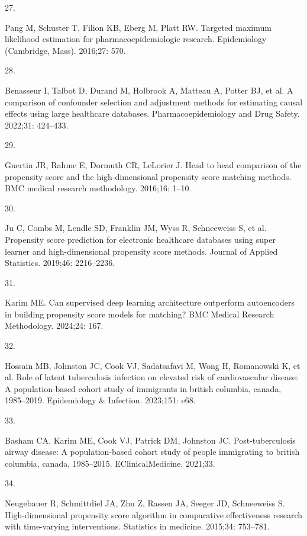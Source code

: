 \documentclass[10pt,letterpaper]{article}
\newlength{\cslhangindent}
\newlength{\csllabelwidth}
\newenvironment{CSLReferences}[2] %
 {\begin{list}{}{%
  \setlength{\itemindent}{0pt}
  \setlength{\leftmargin}{0pt}
  \setlength{\parsep}{0pt}
  \ifodd #1
   \setlength{\leftmargin}{\cslhangindent}
   \setlength{\itemindent}{-1\cslhangindent}
  \fi
  \setlength{\itemsep}{#2\baselineskip}}}
 {\end{list}}
\newcommand{\CSLLeftMargin}[1]{\parbox[t]{\csllabelwidth}{#1}}
\newcommand{\CSLRightInline}[1]{\parbox[t]{\linewidth - \csllabelwidth}{#1}\break}
\begin{document}
\begin{CSLReferences}{0}{1}
\CSLLeftMargin{27. }%
\CSLRightInline{Pang M, Schuster T, Filion KB, Eberg M, Platt RW.
Targeted maximum likelihood estimation for pharmacoepidemiologic
research. Epidemiology (Cambridge, Mass). 2016;27: 570. }

\CSLLeftMargin{28. }%
\CSLRightInline{Benasseur I, Talbot D, Durand M, Holbrook A, Matteau A,
Potter BJ, et al. A comparison of confounder selection and adjustment
methods for estimating causal effects using large healthcare databases.
Pharmacoepidemiology and Drug Safety. 2022;31: 424--433. }

\CSLLeftMargin{29. }%
\CSLRightInline{Guertin JR, Rahme E, Dormuth CR, LeLorier J. Head to
head comparison of the propensity score and the high-dimensional
propensity score matching methods. BMC medical research methodology.
2016;16: 1--10. }

\CSLLeftMargin{30. }%
\CSLRightInline{Ju C, Combs M, Lendle SD, Franklin JM, Wyss R,
Schneeweiss S, et al. Propensity score prediction for electronic
healthcare databases using super learner and high-dimensional propensity
score methods. Journal of Applied Statistics. 2019;46: 2216--2236. }

\CSLLeftMargin{31. }%
\CSLRightInline{Karim ME. Can supervised deep learning architecture
outperform autoencoders in building propensity score models for
matching? BMC Medical Research Methodology. 2024;24: 167. }

\CSLLeftMargin{32. }%
\CSLRightInline{Hossain MB, Johnston JC, Cook VJ, Sadatsafavi M, Wong H,
Romanowski K, et al. Role of latent tuberculosis infection on elevated
risk of cardiovascular disease: A population-based cohort study of
immigrants in british columbia, canada, 1985--2019. Epidemiology \&
Infection. 2023;151: e68. }

\CSLLeftMargin{33. }%
\CSLRightInline{Basham CA, Karim ME, Cook VJ, Patrick DM, Johnston JC.
Post-tuberculosis airway disease: A population-based cohort study of
people immigrating to british columbia, canada, 1985--2015.
EClinicalMedicine. 2021;33. }

\CSLLeftMargin{34. }%
\CSLRightInline{Neugebauer R, Schmittdiel JA, Zhu Z, Rassen JA, Seeger
JD, Schneeweiss S. High-dimensional propensity score algorithm in
comparative effectiveness research with time-varying interventions.
Statistics in medicine. 2015;34: 753--781. }

\end{CSLReferences}

\nolinenumbers
\end{document}
